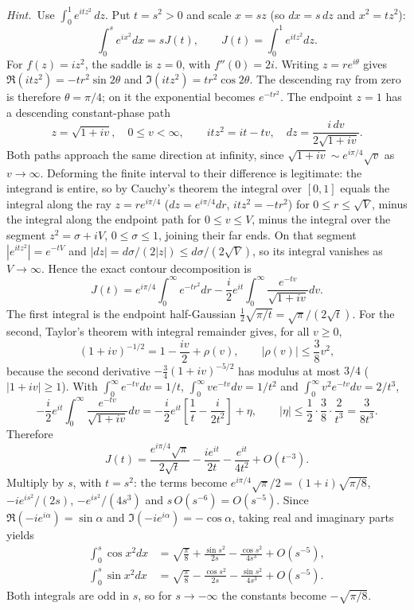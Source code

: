 \emph{Hint.}~Use $\displaystyle\int_{0}^{1}e^{itz^{2}}\,dz$.
\solution
Put $t=s^2>0$ and scale $x=sz$ (so $dx=s\,dz$ and $x^2=tz^2$):
\[
\int_0^s e^{ix^2}dx=sJ(t),\qquad J(t)=\int_0^1e^{itz^2}dz.
\]
For $f(z)=iz^2$, the saddle is $z=0$, with $f''(0)=2i$.
Writing $z=re^{i\theta}$ gives
$\Re(it z^2)=-tr^2\sin2\theta$ and
$\Im(it z^2)=tr^2\cos2\theta$. The descending ray from zero is
therefore $\theta=\pi/4$; on it the exponential becomes $e^{-tr^2}$.
The endpoint $z=1$ has a descending constant-phase path
\[
z=\sqrt{1+iv},\quad 0\le v<\infty,\qquad
it z^2=it-tv,\quad dz=\frac{i\,dv}{2\sqrt{1+iv}}.
\]
Both paths approach the same direction at infinity, since
$\sqrt{1+iv}\sim e^{i\pi/4}\sqrt v$ as $v\to\infty$. Deforming the
finite interval to their difference is legitimate: the integrand is
entire, so by Cauchy's theorem the integral over $[0,1]$ equals the
integral along the ray $z=re^{i\pi/4}$ ($dz=e^{i\pi/4}dr$,
$itz^2=-tr^2$) for $0\le r\le\sqrt V$, minus the integral along the
endpoint path for $0\le v\le V$, minus the integral over the segment
$z^2=\sigma+iV$, $0\le\sigma\le1$, joining their far ends. On that
segment $|e^{itz^2}|=e^{-tV}$ and $|dz|=d\sigma/(2|z|)\le
d\sigma/(2\sqrt V)$, so its integral vanishes as $V\to\infty$.
Hence the exact contour decomposition is
\[
J(t)=e^{i\pi/4}\int_0^\infty e^{-tr^2}dr
-\frac i2e^{it}\int_0^\infty\frac{e^{-tv}}{\sqrt{1+iv}}dv.
\]
The first integral is the endpoint half-Gaussian
$\frac12\sqrt{\pi/t}=\sqrt\pi/(2\sqrt t)$. For the second, Taylor's
theorem with integral remainder gives, for all $v\ge0$,
\[
(1+iv)^{-1/2}=1-\frac{iv}2+\rho(v),\qquad |\rho(v)|\le\frac38v^2,
\]
because the second derivative $-\frac34(1+iv)^{-5/2}$ has modulus at
most $3/4$ ($|1+iv|\ge1$). With $\int_0^\infty e^{-tv}dv=1/t$,
$\int_0^\infty ve^{-tv}dv=1/t^2$ and $\int_0^\infty v^2e^{-tv}dv=2/t^3$,
\[
-\frac i2e^{it}\int_0^\infty\frac{e^{-tv}}{\sqrt{1+iv}}dv
=-\frac i2e^{it}\left[\frac1t-\frac i{2t^2}\right]+\eta,\qquad
|\eta|\le\frac12\cdot\frac38\cdot\frac2{t^3}=\frac3{8t^3}.
\]
Therefore
\[
J(t)=\frac{e^{i\pi/4}\sqrt\pi}{2\sqrt t}
-\frac{ie^{it}}{2t}-\frac{e^{it}}{4t^2}+O(t^{-3}).
\]
Multiply by $s$, with $t=s^2$: the terms become
$e^{i\pi/4}\sqrt\pi/2=(1+i)\sqrt{\pi/8}$, $-ie^{is^2}/(2s)$,
$-e^{is^2}/(4s^3)$ and $s\,O(s^{-6})=O(s^{-5})$. Since
$\Re(-ie^{i\alpha})=\sin\alpha$ and $\Im(-ie^{i\alpha})=-\cos\alpha$,
taking real and imaginary parts yields
\[
\boxed{\begin{aligned}
\int_0^s\cos x^2dx&=\sqrt{\frac\pi8}+\frac{\sin s^2}{2s}
-\frac{\cos s^2}{4s^3}+O(s^{-5}),\\
\int_0^s\sin x^2dx&=\sqrt{\frac\pi8}-\frac{\cos s^2}{2s}
-\frac{\sin s^2}{4s^3}+O(s^{-5}).
\end{aligned}}
\]
Both integrals are odd in $s$, so for $s\to-\infty$ the constants
become $-\sqrt{\pi/8}$.

